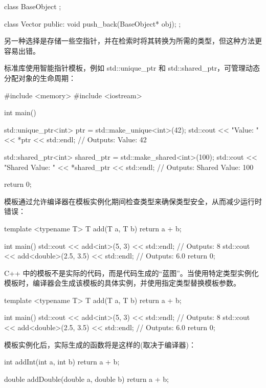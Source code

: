 \begin{cpp}
class BaseObject {};

class Vector {
    public:
        void push_back(BaseObject* obj);
};
\end{cpp}

另一种选择是存储一些空指针，并在检索时将其转换为所需的类型，但这种方法更容易出错。

标准库使用智能指针模板，例如 std::unique\_ptr 和 std::shared\_ptr，可管理动态分配对象的生命周期：

\begin{cpp}
#include <memory>
#include <iostream>

int main() {
    std::unique_ptr<int> ptr = std::make_unique<int>(42);
    std::cout << "Value: " << *ptr << std::endl; // Outputs: Value: 42

    std::shared_ptr<int> shared_ptr = std::make_shared<int>(100);
    std::cout << "Shared Value: " << *shared_ptr << std::endl; // Outputs: Shared Value: 100

    return 0;
}
\end{cpp}

模板通过允许编译器在模板实例化期间检查类型来确保类型安全，从而减少运行时错误：

\begin{cpp}
template <typename T>
T add(T a, T b) {
    return a + b;
}

int main() {
    std::cout << add<int>(5, 3) << std::endl; // Outputs: 8
    std::cout << add<double>(2.5, 3.5) << std::endl; // Outputs: 6.0
    return 0;
}
\end{cpp}


C++ 中的模板不是实际的代码，而是代码生成的“蓝图”。当使用特定类型实例化模板时，编译器会生成该模板的具体实例，并使用指定类型替换模板参数。


\begin{cpp}
template <typename T>
T add(T a, T b) {
    return a + b;
}

int main() {
    std::cout << add<int>(5, 3) << std::endl; // Outputs: 8
    std::cout << add<double>(2.5, 3.5) << std::endl; // Outputs: 6.0
    return 0;
}
\end{cpp}

模板实例化后，实际生成的函数将是这样的(取决于编译器)：

\begin{cpp}
int addInt(int a, int b) {
    return a + b;
}

double addDouble(double a, double b) {
    return a + b;
}
\end{cpp}

